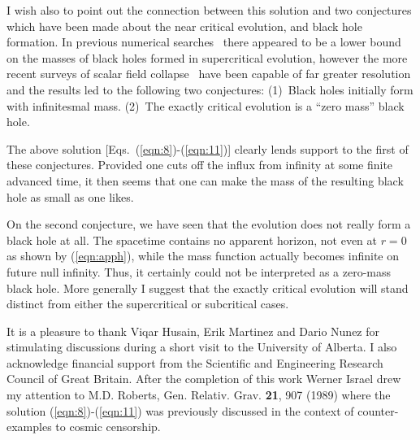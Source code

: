 I wish also to point out the connection between this solution and two
conjectures which have been made about the near critical evolution,  and black
hole formation.  In previous numerical searches~\cite{ref:2} there appeared to
be a lower bound on the masses of black holes formed in supercritical
evolution,  however the more recent surveys of scalar field
collapse~\cite{ref:3,ref:6} have been capable of far greater resolution and the
results led to the following two conjectures:
(1)~Black holes initially form with infinitesmal mass.  (2)~The exactly
critical evolution is a ``zero mass'' black hole.

The above solution [Eqs.~(\ref{eqn:8})-(\ref{eqn:11})] clearly lends support to
the first of these conjectures. Provided one cuts off the influx from infinity
at some finite advanced time, it then seems that one can make the mass of the
resulting black hole as small as one likes.

On the second conjecture, we have seen that the evolution does not really form
a black hole at all.  The spacetime contains no apparent horizon,  not even at
$r=0$ as shown by (\ref{eqn:apph}),  while the mass function actually becomes
infinite on future null infinity.  Thus, it certainly could not be interpreted
as a zero-mass black hole.  More generally I suggest that the exactly critical
evolution will stand distinct from either the supercritical or subcritical
cases.

It is a pleasure to thank Viqar Husain, Erik Martinez and Dario
Nunez for stimulating discussions during a short visit to the
University of Alberta.  I also acknowledge financial support
from the Scientific and Engineering Research Council of Great Britain. After
the completion of this work Werner Israel drew my attention
to M.D. Roberts,  Gen.
Relativ. Grav.  {\bf 21}, 907 (1989) where the solution
(\ref{eqn:8})-(\ref{eqn:11}) was previously discussed in the context of
counter-examples to cosmic censorship.

